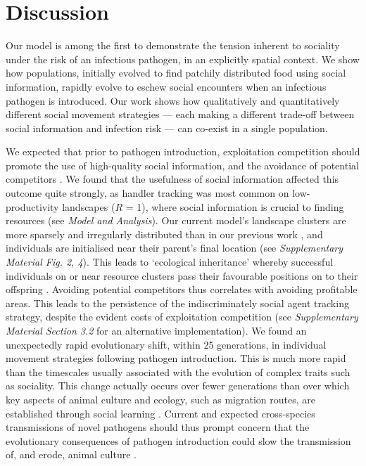 \section*{Discussion}

Our model is among the first to demonstrate the tension inherent to sociality under the risk of an infectious pathogen, in an explicitly spatial context.
We show how populations, initially evolved to find patchily distributed food using social information, rapidly evolve to eschew social encounters when an infectious pathogen is introduced.
Our work shows how qualitatively and quantitatively different social movement strategies --- each making a different trade-off between social information and infection risk --- can co-exist in a single population.

We expected that prior to pathogen introduction, exploitation competition should promote the use of high-quality social information, and the avoidance of potential competitors \citep[handler tracking;][]{gupte2021a}.
We found that the usefulness of social information affected this outcome quite strongly, as handler tracking was most common on low-productivity landscapes ($R$ = 1), where social information is crucial to finding resources (see \textit{Model and Analysis}).
Our current model's landscape clusters are more sparsely and irregularly distributed than in our previous work \citep{gupte2021a}, and individuals are initialised near their parent's final location (see \textit{Supplementary Material Fig. 2, 4}).
This leads to `ecological inheritance' whereby successful individuals on or near resource clusters pass their favourable positions on to their offspring \citep{badyaev2009}.
Avoiding potential competitors thus correlates with avoiding profitable areas.
This leads to the persistence of the indiscriminately social agent tracking strategy, despite the evident costs of exploitation competition (see \textit{Supplementary Material Section 3.2} for an alternative implementation).
We found an unexpectedly rapid evolutionary shift, within 25 generations, in individual movement strategies following pathogen introduction.
This is much more rapid than the timescales usually associated with the evolution of complex traits such as sociality.
This change actually occurs over fewer generations than over which key aspects of animal culture and ecology, such as migration routes, are established through social learning \citep{jesmer2018,cantor2021}.
Current and expected cross-species transmissions of novel pathogens \citep{carlson2021,pusceddu2021} should thus prompt concern that the evolutionary consequences of pathogen introduction could slow the transmission of, and erode, animal culture \citep{cantor2021}.

